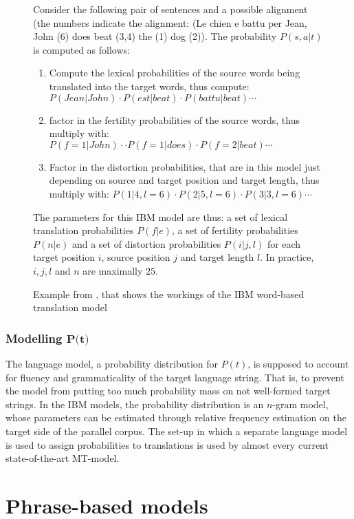 \begin{figure}[!ht]
\begin{framed}
\scriptsize{
Consider the following pair of sentences and a possible alignment (the numbers indicate the alignment: (Le chien e battu per Jean, John (6) does beat (3,4) the (1) dog (2)). The probability $P(s,a|t)$ is computed as follows:\begin{enumerate}
\item Compute the lexical probabilities of the source words being translated into the target words, thus compute: $P(Jean|John)\cdot P(est|beat)\cdot P(battu|beat)\cdots$
\item factor in the fertility probabilities of the source words, thus multiply with:  $P(f\!=\!1|John)\cdot \cdot P(f\!=\!1|does) \cdot P(f\!=\!2|beat)\cdots $
\item Factor in the distortion probabilities, that are in this model just depending on source and target position and target length, thus multiply with: $P(1|4,l\!=\!6)\cdot P(2|5,l\!=\!6)\cdot P(3|3,l\!=\!6) \cdots $
\end{enumerate}
The parameters for this IBM model are thus: a set of lexical translation probabilities $P(f|e)$, a set of fertility probabilities $P(n|e)$ and a set of distortion probabilities $P(i|j,l)$ for each target position $i$, source position $j$ and target length $l$. In practice, $i,j,l$ and $n$ are maximally $25$.
}
\end{framed}
\caption{Example from \cite[p.3]{brown1990statistical}, that shows the workings of the IBM word-based translation model}\label{fig:IBM-model}
\end{figure}


\subsubsection{Modelling $\mathbf{P(t})$}
The language model, a probability distribution for $P(t)$, is supposed to account for fluency and grammaticality of the target language string. That is, to prevent the model from putting too much probability mass on not well-formed target strings. In the IBM models, the probability distribution is an $n$-gram model, whose parameters can be estimated through relative frequency estimation on the target side of the parallel corpus. The set-up in which a separate language model is used to assign probabilities to translations is used by almost every current state-of-the-art MT-model.


\section{Phrase-based models}
\label{sec:pbmodels}

